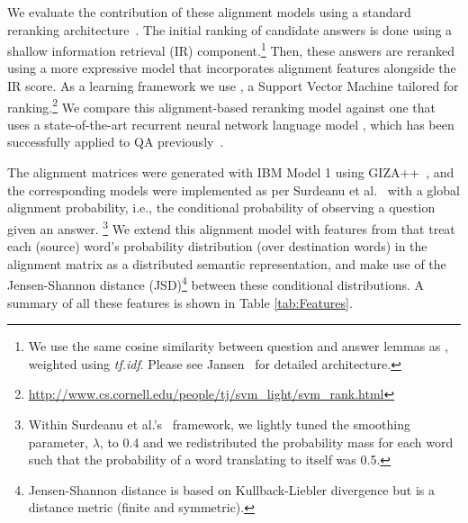 We evaluate the contribution of these alignment models using a standard reranking architecture~\citep{jansen14}.
The initial ranking of candidate answers is done using a shallow information retrieval (IR) component.\footnote{We use the same cosine similarity between question and answer lemmas as \citet{jansen14}, weighted using {\em tf.idf}.  Please see Jansen~\citeyear{jansen14} for detailed architecture.}  
Then, these answers are reranked using a more expressive model that incorporates alignment features alongside the IR score.  As a learning framework we use \svmr , a Support Vector Machine tailored for ranking.\footnote{ \url{http://www.cs.cornell.edu/people/tj/svm_light/svm_rank.html}}
We compare this alignment-based reranking model against one that uses a state-of-the-art recurrent neural network language model \citep{mikolov10,mikolov13}, which has been successfully applied to QA previously~\citep[e.g.,][]{yih13}.


{}  The alignment matrices were generated with IBM Model 1 \cite{Brown:93} using GIZA++~\cite{och03}, and the corresponding models were implemented as per Surdeanu et al.~\citeyear{Surdeanu:11} with a global alignment probability, i.e., the conditional probability of observing a question given an answer.
\footnote{Within Surdeanu et al.'s~\citeyear{Surdeanu:11} framework, we lightly tuned the smoothing parameter, $\lambda$, to 0.4 and we redistributed the probability mass for each word such that the probability of a word translating to itself was 0.5.}  
We extend this alignment model with features from \citet{fried2015higher} that treat each (source) word's probability distribution (over destination words) in the alignment matrix as a distributed semantic representation, and make use of the Jensen-Shannon distance (JSD)\footnote{Jensen-Shannon distance is based on Kullback-Liebler divergence but is a distance metric (finite and symmetric).} between these conditional distributions.  A summary of all these features is shown in Table \ref{tab:Features}.%


